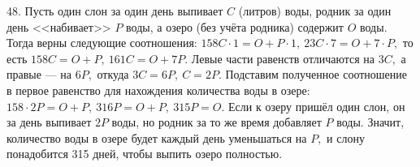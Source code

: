 48. Пусть один слон за один день выпивает $C$ (литров) воды, родник за один день <<набивает>> $P$ воды, а озеро (без учёта родника) содержит $O$ воды. Тогда верны следующие соотношения: $158C\cdot1=O+P\cdot1,\ 23C\cdot7=O+7\cdot P,$ то есть $158C=O+P,\ 161C=O+7P.$ Левые части равенств отличаются на $3C,$ а правые --- на $6P,$ откуда $3C=6P,\ C=2P.$ Подставим полученное соотношение в первое равенство для нахождения количества воды в озере: $158\cdot2P=O+P,\ 316P=O+P,\ 315P=O.$ Если к озеру пришёл один слон, он за день выпивает $2P$ воды, но родник за то же время добавляет $P$ воды. Значит, количество воды в озере будет каждый день уменьшаться на $P,$ и слону понадобится 315 дней, чтобы выпить озеро полностью.\\
